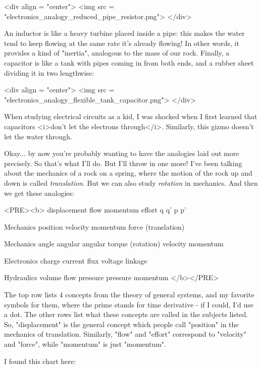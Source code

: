 <div align = "center">
<img src = "electronics_analogy_reduced_pipe_resistor.png">
</div>

An inductor is like a heavy turbine placed inside a pipe: this makes
the water tend to keep flowing at the same rate it's already flowing!
In other words, it provides a kind of "inertia", analogous
to the mass of our rock.  Finally, a capacitor is like a tank with
pipes coming in from both ends, and a rubber sheet dividing it in two
lengthwise:

<div align = "center">
<img src = "electronics_analogy_flexible_tank_capacitor.png">
</div>

When studying electrical circuits as a kid, I was shocked when I first
learned that capacitors <i>don't let the electrons through</i>.
Similarly, this gizmo doesn't let the water through.

Okay... by now you're probably wanting to have the analogies laid out
more precisely.  So that's what I'll do.  But I'll throw in one more!
I've been talking about the mechanics of a rock on a spring, where the
motion of the rock up and down is called \emph{translation}.  But we can
also study \emph{rotation} in mechanics.  And then we get these analogies:

<PRE><b>
                displacement    flow          momentum      effort
                     q           q'              p            p'

Mechanics       position       velocity       momentum      force
(translation)

Mechanics       angle          angular        angular       torque
(rotation)                     velocity       momentum

Electronics     charge         current        flux          voltage
                                              linkage

Hydraulics      volume         flow           pressure      pressure
                                              momentum
</b></PRE>

The top row lists 4 concepts from the theory of general systems, and
my favorite symbols for them, where the prime stands for time
derivative - if I could, I'd use a dot.  The other rows list what
these concepts are called in the subjects listed.  So,
"displacement" is the general concept which people call
"position" in the mechanics of translation.  Similarly,
"flow" and "effort" correspond to
"velocity" and "force", while "momentum"
is just "momentum".

I found this chart here:

